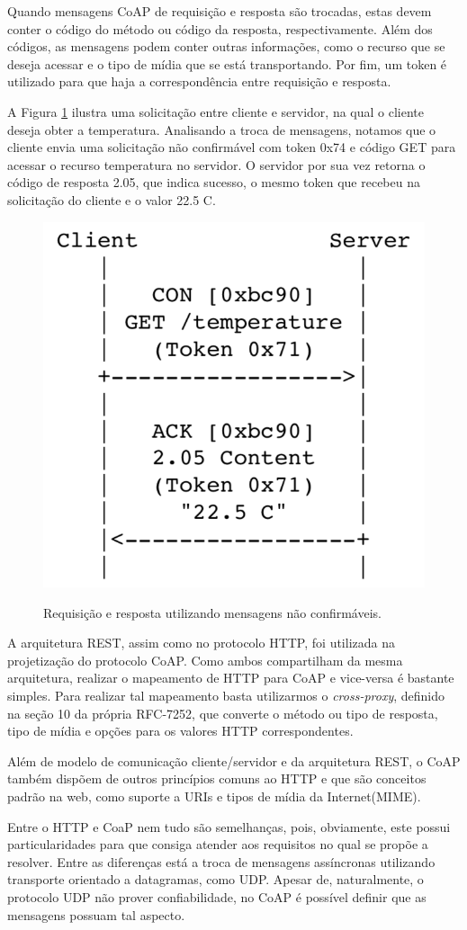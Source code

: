 Quando mensagens CoAP de requisição e resposta são trocadas, estas devem conter o código do método ou código da resposta, respectivamente.
Além dos códigos, as mensagens podem conter outras informações, como o recurso que se deseja acessar e o tipo de mídia que se está transportando.
Por fim, um token é utilizado para que haja a correspondência entre requisição e resposta.

A Figura \ref{fig:fig4} ilustra uma solicitação entre cliente e servidor, na qual o cliente deseja obter a temperatura.
Analisando a troca de mensagens, notamos que o cliente envia uma solicitação não confirmável com token 0x74 e código GET para acessar o recurso temperatura no servidor.
O servidor por sua vez retorna o código de resposta 2.05, que indica sucesso, o mesmo token que recebeu na solicitação do cliente e o valor 22.5 C.

\begin{figure}[htb!]
    \centering\includegraphics[height=.4\textwidth]{fig4.png} 
    \caption
    {\label{fig:fig4} Requisição e resposta utilizando mensagens não confirmáveis.} \cite{rfc7252}
\end{figure}

A arquitetura REST, assim como no protocolo HTTP\cite{rfc2616}, foi utilizada na projetização do protocolo CoAP.
Como ambos compartilham da mesma arquitetura, realizar o mapeamento de HTTP para CoAP e vice-versa é bastante simples.
Para realizar tal mapeamento basta utilizarmos o \textit{cross-proxy}, definido na seção 10 da própria RFC-7252\cite{rfc7252},
que converte o método ou tipo de resposta, tipo de mídia e opções para os valores HTTP correspondentes.

Além de modelo de comunicação cliente/servidor e da arquitetura REST, o CoAP também dispõem de outros princípios comuns ao HTTP e que são conceitos padrão na web,
como suporte a URIs\cite{rfc3986} e tipos de mídia da Internet(MIME)\cite{rfc2046}.

Entre o HTTP e CoaP nem tudo são semelhanças, pois, obviamente, este possui particularidades para que consiga atender aos requisitos no qual se propõe a resolver.
Entre as diferenças está a troca de mensagens assíncronas utilizando transporte orientado a datagramas, como UDP.
Apesar de, naturalmente, o protocolo UDP não prover confiabilidade, no CoAP é possível definir que as mensagens possuam tal aspecto.

